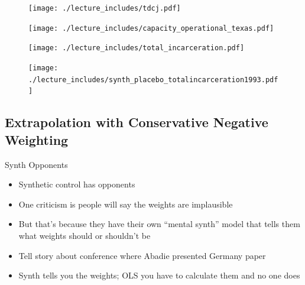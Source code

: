 \documentclass{beamer}
\begin{document}
\begin{frame}[shrink=30,plain]

\begin{figure}
\texttt{[image: ./lecture\_includes/tdcj.pdf]}
\end{figure}
\end{frame}


\begin{frame}[shrink=30,plain]
\begin{figure}
\texttt{[image: ./lecture\_includes/capacity\_operational\_texas.pdf]}
\end{figure}
\end{frame}



\begin{frame}[shrink=30,plain]

\begin{figure}
\texttt{[image: ./lecture\_includes/total\_incarceration.pdf]}
\end{figure}
\end{frame}

\begin{frame}[shrink=30,plain]

\begin{figure}
\texttt{[image: ./lecture\_includes/synth\_placebo\_totalincarceration1993.pdf]}
\end{figure}
\end{frame}





\subsection{Extrapolation with Conservative Negative Weighting}

\begin{frame}{Synth Opponents}

\begin{itemize}

\item Synthetic control has opponents
\item One criticism is people will say the weights are implausible
\item But that's because they have their own ``mental synth'' model that tells them what weights should or shouldn't be
\item Tell story about conference where Abadie presented Germany paper
\item Synth tells you the weights; OLS you have to calculate them and no one does

\end{itemize}

\end{frame}
\end{document}

